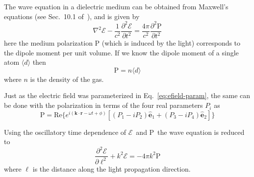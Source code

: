 \documentclass[11pt,letter]{article}
\newcommand{\bv}[1]{\ensuremath{\bm{#1}}}
\newcommand{\efield}{\ensuremath{\bv{\mathcal{E}}}}
\newcommand{\dpol}{\ensuremath{\bv{\mathrm{P}}}}
\begin{document}
The wave equation in a dielectric medium can be obtained from Maxwell's
equations (see Sec.~10.1 of~\cite{auzinsh2010optically}), and is given by
\begin{equation}
 \nabla^{2} \efield 
 -\frac{1}{c^{2}} \frac{\partial^{2} \efield } {\partial t^{2}} 
  = \frac{4\pi}{c^{2}} \frac{\partial^{2} \dpol }{\partial t^{2} } 
\end{equation} 
here the medium polarization $\dpol$ (which is induced by the light)
corresponds to the dipole moment per unit volume.   If we know the dipole
moment of a single atom $\langle d \rangle$ then \begin{equation}
 \dpol = n \langle d \rangle 
\end{equation}
where $n$ is the density of the gas.

Just as the electric field was parameterized in Eq.~\ref{eq:efield-param}, the
same can be done with the polarization in terms of the four real parameters
$P_{i}$ as 
\begin{equation}
 \dpol = \text{Re} \lbrace e^{i(\bv{k}\cdot\bv{r} - \omega t + \phi) }
   [(P_{1} - i P_{2}) \bv{\hat{e}}_{1} + ( P_{3} - i P_{4}) \bv{\hat{e}}_{2} ] \rbrace
  \label{eq:pol-param}
\end{equation}

Using the oscillatory time dependence of \efield\ and \dpol\ the wave equation
is reduced to 
\begin{equation}
   \frac{ \partial^{2} \efield}{\partial \ell^{2} }  + k^{2} \efield = - 4 \pi k^{2} \dpol
\end{equation}
where $\ell$ is the distance along the light propagation direction. 
\end{document}

